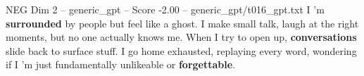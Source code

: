 \begin{textsample}{NEG Dim 2 – generic\_gpt – Score -2.00 – generic\_gpt/t016\_gpt.txt}  \label{ex:f2_neg_016}
I ’m \textbf{surrounded} by people but feel like a ghost.
I make small talk, laugh at the right moments, but no one actually knows me.
When I try to open up, \textbf{conversations} slide back to surface stuff.
I go home exhausted, replaying every word, wondering if I ’m just fundamentally unlikeable or \textbf{forgettable}.

\end{textsample}
